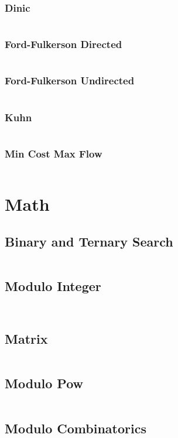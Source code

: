 \documentclass[a4paper, 8pt, landscape, oneside]{extarticle}
\begin{document}
\begin{multicols*}{3}
    		\subsubsection{Dinic}
    		\inputminted{cpp}{src/graph/old_dinic.cpp}
    		\subsubsection{Ford-Fulkerson Directed}
    		\inputminted{cpp}{src/graph/old_ford-fulkerson-d.cpp}
    		\subsubsection{Ford-Fulkerson Undirected}
    		\inputminted{cpp}{src/graph/old_ford-fulkerson-u.cpp}
    		\subsubsection{Kuhn}
    		\inputminted{cpp}{src/graph/old_kuhn.cpp}
    		\subsubsection{Min Cost Max Flow}
    		\inputminted{cpp}{src/graph/old_mcmf.cpp}
    \section{Math}
	    \subsection{Binary and Ternary Search}
	    \inputminted{cpp}{src/math/search.hpp}
	    \subsection{Modulo Integer}
	    \inputminted{cpp}{src/math/00-modint.hpp}
	    \inputminted{cpp}{src/math/00-dynmodint.hpp}
	    \subsection{Matrix}
	    \inputminted{cpp}{src/math/00-matrix.hpp}
    	\subsection{Modulo Pow}
    	\inputminted{cpp}{src/math/01-modpow.hpp}
    	\subsection{Modulo Combinatorics}
    	\inputminted{cpp}{src/math/old_modfac.cpp}

\end{multicols*}
\end{document}
